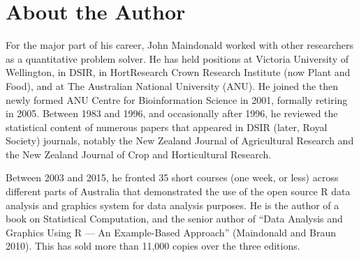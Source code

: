 \documentclass[
  10pt,
  b5paper]{book}
\begin{document}
\hypertarget{about-the-author}{%
\chapter*{About the Author}\label{about-the-author}}

For the major part of his career, John Maindonald worked with other
researchers as a quantitative problem solver.
He has held positions at Victoria University of Wellington, in DSIR, in HortResearch Crown Research Institute (now Plant and Food), and at The Australian National University (ANU). He joined the then newly formed ANU Centre for Bioinformation Science in 2001, formally retiring in 2005.
Between 1983 and 1996, and occasionally after 1996, he reviewed the statistical content of numerous papers that appeared in DSIR (later, Royal Society) journals, notably the New Zealand Journal of Agricultural Research and the New Zealand Journal of Crop and Horticultural Research.

Between 2003 and 2015, he fronted 35 short courses (one week, or less)
across different parts of Australia that demonstrated the use of the open source R data analysis and graphics system for data analysis purposes.
He is the author of a book on Statistical Computation, and the senior author of ``Data Analysis and Graphics Using R --- An Example-Based Approach'' (Maindonald and Braun 2010). This has sold more than 11,000 copies over
the three editions.
\end{document}
